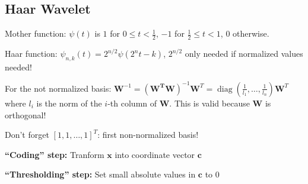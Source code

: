 \documentclass[a4paper, 11pt, landscape]{article}
\DeclareMathOperator*{\argmin}{arg\,min}
\begin{document}
\begin{multicols*}{3}


\section{Haar Wavelet}
\begin{compactdesc}
	\item[Mother function:] $\psi(t)$ is $1$ for $0 \leq t < \frac{1}{2}$, $-1$ for $\frac{1}{2} \leq t < 1$, $0$ otherwise.
	\item[Haar function:] $\psi_{n,k}(t) = 2^{n/2} \psi(2^n t - k)$, $2^{n/2}$ only needed if normalized values needed!
\end{compactdesc}

\begin{compactitem}
	\item For the not normalized basis: $\mathbf{W}^{-1} = (\mathbf{W^T} \mathbf{W})^{-1} \mathbf{W}^T = \operatorname{diag}(\frac{1}{l_1}, \ldots, \frac{1}{l_n}) \mathbf{W}^T$ where $l_i$ is the norm of the $i$-th column of $\mathbf{W}$. This is valid because $\mathbf{W}$ is orthogonal!
	\item Don't forget $[1, 1, \ldots, 1]^T$: first non-normalized basis!
	\item \textbf{``Coding'' step:} Tranform $\mathbf{x}$ into coordinate vector $\mathbf{c}$
	\item \textbf{``Thresholding'' step:} Set small absolute values in $\mathbf{c}$ to $0$
\end{compactitem}


\end{multicols*}
\end{document}
